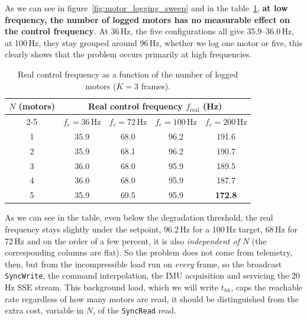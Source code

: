 \documentclass{tropLaClasse}
\begin{document}
As we can see in figure~\ref{fig:motor_logging_sweep} and in the table~\ref{tab:matrix}, \textbf{at low frequency, the number of logged motors has no measurable effect on the control frequency}. At 36\,Hz, the five configurations all give 35.9--36.0\,Hz, at 100\,Hz, they stay grouped around 96\,Hz, whether we log one motor or five, this clearly shows that the problem occurs primarily at high frequencies.

\begin{table}[H]
\centering
\begin{tabular}{|c|c|c|c|c|}
\hline
\multirow{2}{*}{$N$ (motors)} & \multicolumn{4}{c|}{Real control frequency $f_{\text{real}}$ (Hz)} \\ \cline{2-5}
 & $f_c = 36$\,Hz & $f_c = 72$\,Hz & $f_c = 100$\,Hz & $f_c = 200$\,Hz \\ \hline
1 & 35.9 & 68.0 & 96.2 & 191.6 \\ \hline
2 & 35.9 & 68.1 & 96.2 & 190.7 \\ \hline
3 & 36.0 & 68.0 & 95.9 & 189.5 \\ \hline
4 & 36.0 & 68.0 & 95.9 & 187.7 \\ \hline
5 & 35.9 & 69.5 & 95.9 & \textbf{172.8} \\ \hline
\end{tabular}
\caption{Real control frequency as a function of the number of logged motors ($K = 3$ frames).}
\label{tab:matrix}
\end{table}

As we can see in the table, even below the degradation threshold, the real frequency stays slightly under the setpoint, 96.2\,Hz for a 100\,Hz target, 68\,Hz for 72\,Hz and on the order of a few percent, it is also \emph{independent of $N$} (the corresponding columns are flat). So the problem does not come from telemetry, then, but from the incompressible load run on \emph{every} frame, so the broadcast \texttt{SyncWrite}, the command interpolation, the IMU acquisition and servicing the 20\,Hz SSE stream. This background load, which we will write $t_{hk}$, caps the reachable rate regardless of how many motors are read, it should be distinguished from the extra cost, variable in $N$, of the \texttt{SyncRead} read.
\end{document}
